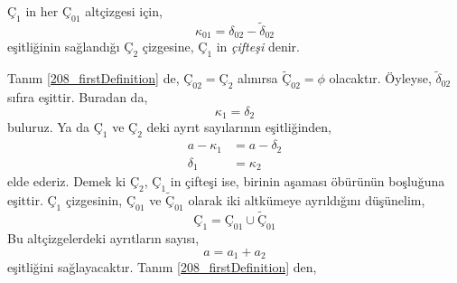 \documentclass[11pt]{amsbook}
\begin{document}

\begin{definition}
	\label{208_firstDefinition}
	$Ç_{1}$ in her $Ç_{01}$ altçizgesi için,
	\[
		\kappa_{01}=\delta_{02}-\tilde{\delta}_{02}
	\]
	eşitliğinin sağlandığı $Ç_{2}$ çizgesine, $Ç_{1}$ in \emph{çifteşi} denir.
\end{definition}

Tanım \ref{208_firstDefinition} de, $Ç_{02} = Ç_{2}$ alınırsa $\tilde{Ç}_{02} = \phi$ olacaktır. Öyleyse, $\tilde{\delta}_{02}$ sıfıra eşittir. Buradan da,
\[
	\kappa_{1} = \delta_{2}
\]
buluruz. Ya da $Ç_{1}$ ve $Ç_{2}$ deki ayrıt sayılarının eşitliğinden,
\begin{align*}
	a - \kappa_{1} &= a - \delta_{2}\\
	\delta_{1} &= \kappa_{2}
\end{align*}
elde ederiz. Demek ki $Ç_{2}$, $Ç_{1}$ in çifteşi ise, birinin aşaması öbürünün boşluğuna eşittir. $Ç_{1}$ çizgesinin, $Ç_{01}$ ve $\tilde{Ç}_{01}$ olarak iki altkümeye ayrıldığını düşünelim,
\[
	Ç_{1} = Ç_{01} \cup \tilde{Ç}_{01}
\]
Bu altçizgelerdeki ayrıtların sayısı,
\[
	a = a_{1} + a_{2}
\]
eşitliğini sağlayacaktır. Tanım \ref{208_firstDefinition} den,
\end{document}
